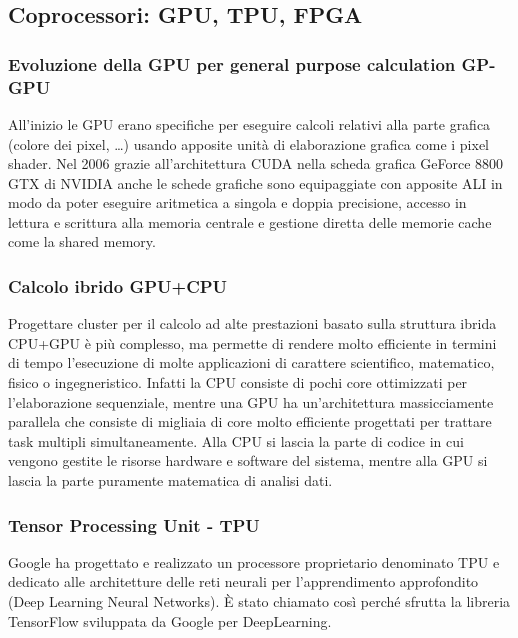 \documentclass[a4paper]{article}
\begin{document}
\newpage


\subsection{Coprocessori: GPU, TPU, FPGA}
\subsubsection*{Evoluzione della GPU per general purpose calculation GP-GPU}
All'inizio le GPU erano specifiche per eseguire calcoli relativi alla parte grafica (colore dei pixel, \dots) usando apposite
unità di elaborazione grafica come i pixel shader. Nel 2006 grazie all'architettura CUDA nella scheda grafica GeForce 8800 GTX
di NVIDIA anche le schede grafiche sono equipaggiate con apposite ALI in modo da poter eseguire aritmetica a singola e doppia
precisione, accesso in lettura e scrittura alla memoria centrale e gestione diretta delle memorie cache come la shared memory.

\subsubsection*{Calcolo ibrido GPU+CPU}
Progettare cluster per il calcolo ad alte prestazioni basato sulla struttura ibrida CPU+GPU è più complesso, ma permette di
rendere molto efficiente in termini di tempo l'esecuzione di molte applicazioni di carattere scientifico, matematico, fisico
o ingegneristico. Infatti la CPU consiste di pochi core ottimizzati per l'elaborazione sequenziale, mentre una GPU ha
un'architettura massicciamente parallela che consiste di migliaia di core molto efficiente progettati per trattare task
multipli simultaneamente. Alla CPU si lascia la parte di codice in cui vengono gestite le risorse hardware e software del
sistema, mentre alla GPU si lascia la parte puramente matematica di analisi dati.

\subsubsection*{Tensor Processing Unit - TPU}
Google ha progettato e realizzato un processore proprietario denominato TPU e dedicato alle architetture delle reti neurali per
l’apprendimento approfondito (Deep Learning Neural Networks). È stato chiamato così perché sfrutta la libreria TensorFlow 
sviluppata da Google per DeepLearning.
\end{document}
